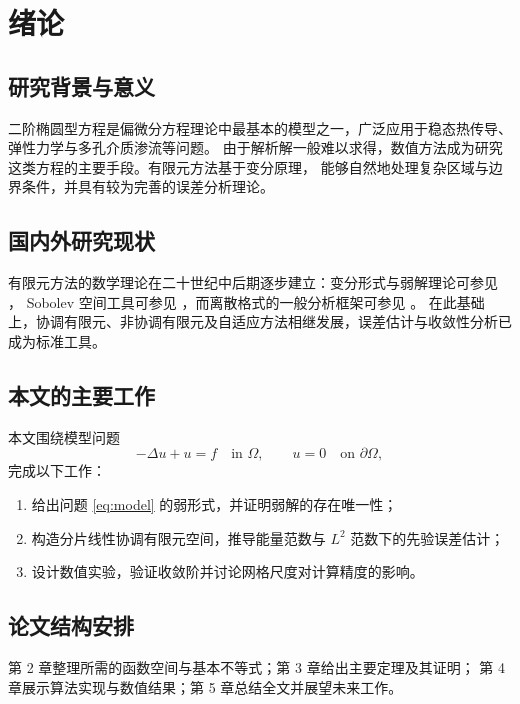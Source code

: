 \chapter{绪论}

\section{研究背景与意义}

二阶椭圆型方程是偏微分方程理论中最基本的模型之一，广泛应用于稳态热传导、弹性力学与多孔介质渗流等问题。
由于解析解一般难以求得，数值方法成为研究这类方程的主要手段。有限元方法基于变分原理，
能够自然地处理复杂区域与边界条件，并具有较为完善的误差分析理论\cite{ciarlet1978,brenner2008}。

\section{国内外研究现状}

有限元方法的数学理论在二十世纪中后期逐步建立：变分形式与弱解理论可参见 \cite{evans2010,lax1954}，
Sobolev 空间工具可参见 \cite{adams2003}，而离散格式的一般分析框架可参见 \cite{strang1973}。
在此基础上，协调有限元、非协调有限元及自适应方法相继发展，误差估计与收敛性分析已成为标准工具。

\section{本文的主要工作}

本文围绕模型问题
\begin{equation}\label{eq:model}
-\Delta u + u = f \quad \text{in } \Omega, \qquad u = 0 \quad \text{on } \partial\Omega,
\end{equation}
完成以下工作：

\begin{enumerate}[label=(\arabic*)]
  \item 给出问题 \eqref{eq:model} 的弱形式，并证明弱解的存在唯一性；
  \item 构造分片线性协调有限元空间，推导能量范数与 $L^2$ 范数下的先验误差估计；
  \item 设计数值实验，验证收敛阶并讨论网格尺度对计算精度的影响。
\end{enumerate}

\section{论文结构安排}

第 2 章整理所需的函数空间与基本不等式；第 3 章给出主要定理及其证明；
第 4 章展示算法实现与数值结果；第 5 章总结全文并展望未来工作。
